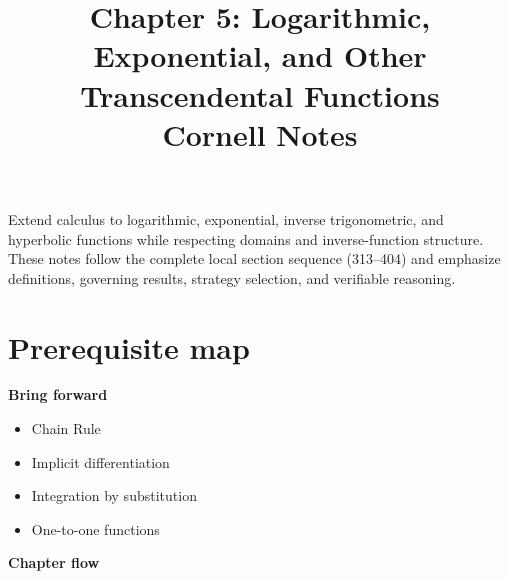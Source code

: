 \documentclass[11pt]{article}
\title{Chapter 5: Logarithmic, Exponential, and Other Transcendental Functions\\[2mm]\large Cornell Notes}
\author{}
\date{}
\begin{document}
\maketitle
\thispagestyle{fancy}
\begin{orientationbox}
Extend calculus to logarithmic, exponential, inverse trigonometric, and hyperbolic functions while respecting domains and inverse-function structure. These notes follow the complete local section sequence (313--404) and emphasize definitions, governing results, strategy selection, and verifiable reasoning.
\end{orientationbox}

\section{Prerequisite map}
\begin{minipage}[t]{0.42\textwidth}
\textbf{Bring forward}
\begin{itemize}
\item Chain Rule
\item Implicit differentiation
\item Integration by substitution
\item One-to-one functions
\end{itemize}
\end{minipage}\hfill
\begin{minipage}[t]{0.54\textwidth}
\textbf{Chapter flow}
\begin{center}
\end{center}
\end{minipage}
\end{document}
